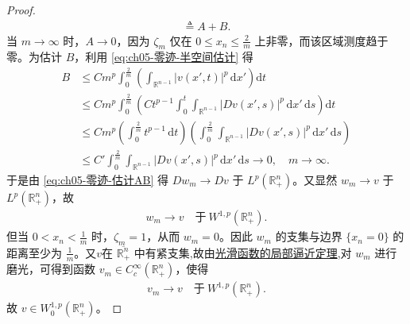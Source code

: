 \documentclass[../../main.tex]{subfiles}
\begin{document}
\begin{proof}
\begin{align}
\triangleq A+B.
\end{align}
当 $m\to\infty$ 时，$A\to 0$，因为 $\zeta_{m}$ 仅在 $0\leqslant x_{n}\leqslant \frac{2}{m}$ 上非零，而该区域测度趋于零。为估计 $B$，利用 \eqref{eq:ch05-零迹-半空间估计} 得
\begin{align*}
B
&\leqslant Cm^{p}\int_{0}^{\frac{2}{m}}\left(\int_{\mathbb{R}^{n-1}}|v(x',t)|^{p}\,\mathrm{d}x'\right)\mathrm{d}t\\
&\leqslant Cm^{p}\int_{0}^{\frac{2}{m}}\left(Ct^{p-1}\int_{0}^{t}\int_{\mathbb{R}^{n-1}}|Dv(x',s)|^{p}\,\mathrm{d}x'\,\mathrm{d}s\right)\mathrm{d}t\\
&\leqslant Cm^{p}\left(\int_{0}^{\frac{2}{m}}t^{p-1}\,\mathrm{d}t\right)
\left(\int_{0}^{\frac{2}{m}}\int_{\mathbb{R}^{n-1}}|Dv(x',s)|^{p}\,\mathrm{d}x'\,\mathrm{d}s\right)\\
&\leqslant C'\int_{0}^{\frac{2}{m}}\int_{\mathbb{R}^{n-1}}|Dv(x',s)|^{p}\,\mathrm{d}x'\,\mathrm{d}s\to 0,\quad m\to\infty.
\end{align*}
于是由 \eqref{eq:ch05-零迹-估计AB} 得 $Dw_{m}\to Dv$ 于 $L^{p}(\mathbb{R}^{n}_{+})$。又显然 $w_{m}\to v$ 于 $L^{p}(\mathbb{R}^{n}_{+})$，故
\begin{align*}
w_{m}\to v\quad\text{于}\ W^{1,p}(\mathbb{R}^{n}_{+}).
\end{align*}
但当 $0<x_{n}<\frac{1}{m}$ 时，$\zeta_{m}=1$，从而 $w_{m}=0$。因此 $w_{m}$ 的支集与边界 $\{x_{n}=0\}$ 的距离至少为 $\frac{1}{m}$。又$v$在 $\overline{\mathbb{R}^{n}_{+}}$ 中有紧支集,故由\hyperref[theorem:ch05-光滑函数的局部逼近定理]{光滑函数的局部逼近定理},对 $w_{m}$ 进行磨光，可得到函数 $v_{m}\in C^{\infty}_{c}(\mathbb{R}^{n}_{+})$，使得
\begin{align*}
v_{m}\to v\quad\text{于}\ W^{1,p}(\mathbb{R}^{n}_{+}).
\end{align*}
故 $v\in W^{1,p}_{0}(\mathbb{R}^{n}_{+})$。


\end{proof}
\end{document}
